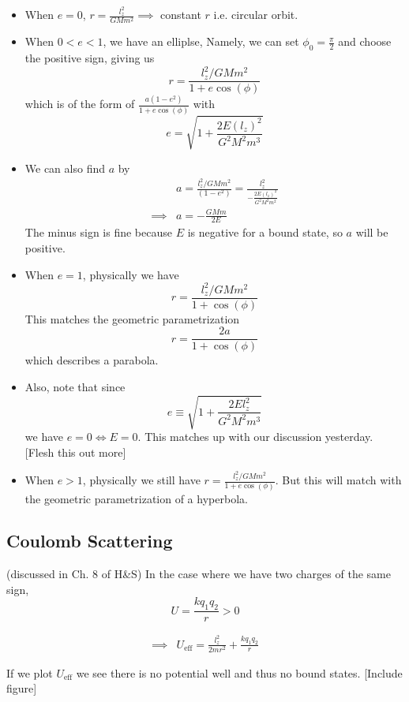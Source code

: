 \documentclass[11pt]{article}
\begin{document}
\begin{itemize}
  \item When $e = 0$, $r = \frac{l_z^2}{GMm^2} \implies $ constant $r$ i.e. circular orbit.
  \item When $0 < e < 1$, we have an elliplse, Namely, we can set $\phi_0 = \frac{\pi}{2}$ and choose the positive sign, giving us 
  \[ r = \frac{l_z^2 / GMm^2}{1 + e\cos(\phi)} \]
  which is of the form of $\frac{a(1-e^2)}{1+e\cos(\phi)}$ with 
  \[ e = \sqrt{1+ \frac{2E(l_z)^2}{G^2M^2m^3}} \] 

  \item We can also find $a$ by 
  \begin{align*}
    &a = \frac{l_z^2 / GMm^2}{(1-e^2)} = \frac{l_z^2}{- \frac{2E(l_z)^2}{G^2M^2m^2} } \\
    \implies& a = - \frac{GMm}{2E}
  \end{align*}
  The minus sign is fine because $E$ is negative for a bound state, so $a$ will be positive.

  \item When $e = 1$, physically we have 
  \[ r = \frac{l_z^2 / GMm^2}{1 + \cos(\phi)} \]
  This matches the geometric parametrization 
  \[ r = \frac{2a}{1+\cos(\phi)} \]
  which describes a parabola.

  \item Also, note that since 
  \[ e \equiv \sqrt{1 + \frac{2El_z^2}{G^2 M^2 m^3}} \]
  we have $e = 0 \Leftrightarrow E = 0$. This matches up with our discussion yesterday. [Flesh this out more]

  \item When $e > 1$, physically we still have $r = \frac{l_z^2 / GMm^2}{1 + e \cos(\phi)}$. But this will match with the geometric parametrization of a hyperbola.
\end{itemize}

\vskip 1cm
\subsection{Coulomb Scattering}
(discussed in Ch. 8 of H\&S)
In the case where we have two charges of the same sign, 
\[ U = \frac{kq_1 q_2}{r} > 0 \]


\begin{align*}
  \implies& U_{\text{eff}} = \frac{l_z^2}{2m r^2} + \frac{k q_1 q_2}{r}
\end{align*}

\vskip 0.5cm
If we plot $U_{\text{eff}}$ we see there is no potential well and thus no bound states.
[Include figure]
\end{document}
